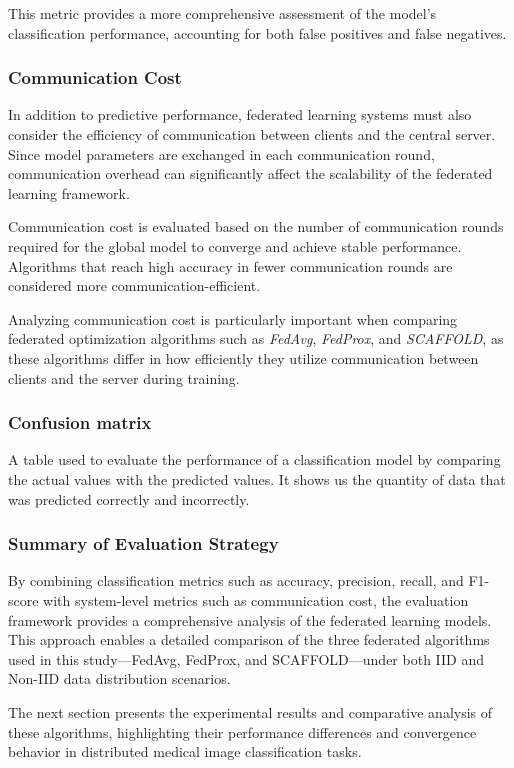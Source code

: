 \documentclass[12pt]{book}
\begin{document}
This metric provides a more comprehensive assessment of the model’s classification performance, accounting for both false positives and false negatives.

\subsubsection{Communication Cost}

In addition to predictive performance, federated learning systems must also consider the efficiency of communication between clients and the central server. Since model parameters are exchanged in each communication round, communication overhead can significantly affect the scalability of the federated learning framework.

Communication cost is evaluated based on the number of communication rounds required for the global model to converge and achieve stable performance. Algorithms that reach high accuracy in fewer communication rounds are considered more communication-efficient.

Analyzing communication cost is particularly important when comparing federated optimization algorithms such as \textit{FedAvg}, \textit{FedProx}, and \textit{SCAFFOLD}, as these algorithms differ in how efficiently they utilize communication between clients and the server during training.\

\subsubsection{Confusion matrix}
A table used to evaluate the performance of a classification model by comparing the actual values with the predicted values. It shows us the quantity of data that was predicted correctly and incorrectly.\

\subsubsection{Summary of Evaluation Strategy}

By combining classification metrics such as accuracy, precision, recall, and F1-score with system-level metrics such as communication cost, the evaluation framework provides a comprehensive analysis of the federated learning models. This approach enables a detailed comparison of the three federated algorithms used in this study—FedAvg, FedProx, and SCAFFOLD—under both IID and Non-IID data distribution scenarios.

The next section presents the experimental results and comparative analysis of these algorithms, highlighting their performance differences and convergence behavior in distributed medical image classification tasks.
\end{document}
